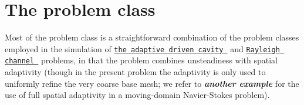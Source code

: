 

\hypertarget{index_problem}{}\section{The problem class}\label{index_problem}
Most of the problem class is a straightforward combination of the problem classes employed in the simulation of \href{../../driven_cavity/html/index.html}{\tt the adaptive driven cavity } and \href{../../rayleigh_channel/html/index.html}{\tt Rayleigh channel } problems, in that the problem combines unsteadiness with spatial adaptivity (though in the present problem the adaptivity is only used to uniformly refine the very coarse base mesh; we refer to {\itshape {\bfseries another example}} for the use of full spatial adaptivity in a moving-\/domain Navier-\/\+Stokes problem).

 
